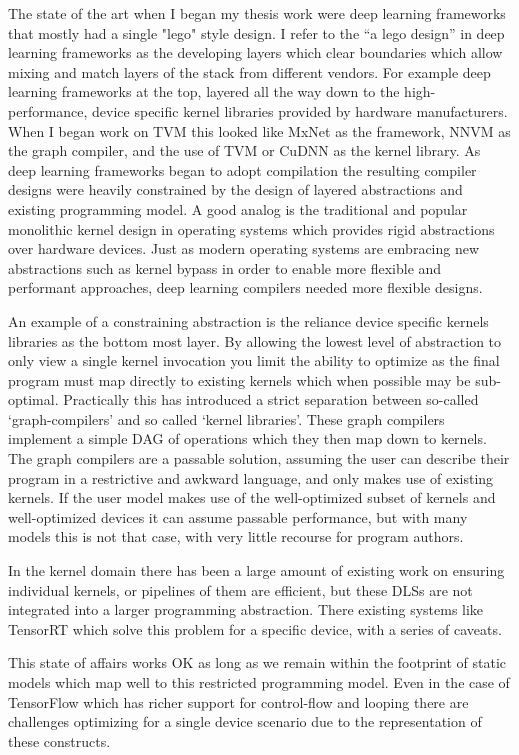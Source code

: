 The state of the art when I began my thesis work were
  deep learning frameworks that mostly had a single "lego" style design.
I refer to the ``a lego design'' in deep learning frameworks
  as the developing layers which clear boundaries which
  allow mixing and match layers of the stack from different vendors.
For example deep learning frameworks at the top,
  layered all the way down to the high-performance,
  device specific kernel libraries provided by hardware manufacturers.
When I began work on TVM this looked like MxNet as the framework,
  NNVM as the graph compiler, and the use of TVM or CuDNN as the
  kernel library.
As deep learning frameworks began to adopt compilation
  the resulting compiler designs were heavily constrained by the
  design of layered abstractions and existing programming model.
A good analog is the traditional and popular monolithic kernel design
  in operating systems which provides rigid abstractions over
  hardware devices.
Just as modern operating systems are embracing new abstractions
  such as kernel bypass in order to enable more flexible and
  performant approaches, deep learning compilers needed more
  flexible designs.

An example of a constraining abstraction is the reliance
  device specific kernels libraries as the bottom most layer.
By allowing the lowest level of abstraction to only view a single
  kernel invocation you limit the ability to optimize as the final
  program must map directly to existing kernels which when possible
  may be sub-optimal.
Practically this has introduced a strict separation between so-called
  ‘graph-compilers’ and so called ‘kernel libraries’.
These graph compilers implement a simple DAG of operations
  which they then map down to kernels.
The graph compilers are a passable solution, assuming the user can describe their program
  in a restrictive and awkward language, and only makes use of existing kernels.
If the user model makes use of the well-optimized subset of kernels and well-optimized devices
  it can assume passable performance, but with many models this is not that case, with very little recourse for program authors.

In the kernel domain there has been a large amount of existing work on
  ensuring individual kernels, or pipelines of them are efficient,
  but these DLSs are not integrated into a larger programming abstraction.
There existing systems like TensorRT which solve this problem for a specific device,
  with a series of caveats.

This state of affairs works OK as long as we remain within the footprint of static
  models which map well to this restricted programming model.
Even in the case of TensorFlow which has richer support for control-flow and
  looping there are challenges optimizing for a single device scenario due
  to the representation of these constructs.

